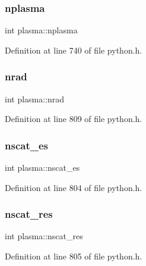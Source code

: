 \mbox{\label{structplasma_a8220b5d466addc895b973f092d9b7b15}} 
\subsubsection{\texorpdfstring{nplasma}{nplasma}}
{\footnotesize\ttfamily int plasma\+::nplasma}



Definition at line 740 of file python.\+h.

\mbox{\label{structplasma_ab2eba1f8343e4767fd32dc914fb95397}} 
\subsubsection{\texorpdfstring{nrad}{nrad}}
{\footnotesize\ttfamily int plasma\+::nrad}



Definition at line 809 of file python.\+h.

\mbox{\label{structplasma_ad9c354375042457b537f41282f6d7538}} 
\subsubsection{\texorpdfstring{nscat\+\_\+es}{nscat\_es}}
{\footnotesize\ttfamily int plasma\+::nscat\+\_\+es}



Definition at line 804 of file python.\+h.

\mbox{\label{structplasma_aa13320251f70b79c8794a90cf70fe003}} 
\subsubsection{\texorpdfstring{nscat\+\_\+res}{nscat\_res}}
{\footnotesize\ttfamily int plasma\+::nscat\+\_\+res}



Definition at line 805 of file python.\+h.

\mbox{\label{structplasma_aa22c8b26e65db4f93a14fa183d7e09e6}} 
